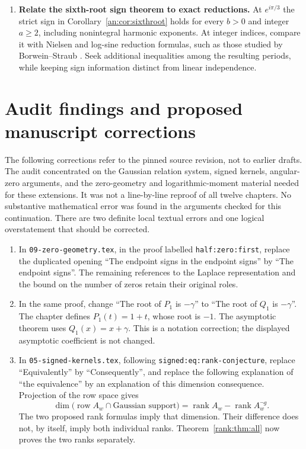 \documentclass[11pt]{article}
\numberwithin{equation}{section}
\theoremstyle{plain}
\theoremstyle{definition}
\theoremstyle{remark}
\DeclareMathOperator{\rank}{rank}
\begin{document}
\begin{enumerate}[leftmargin=*,itemsep=5pt,start=7]
\item \textbf{Relate the sixth-root sign theorem to exact reductions.}
At $e^{i\pi/3}$ the strict sign in Corollary~\ref{an:cor:sixthroot}
holds for every $b>0$ and integer $a\ge2$, including nonintegral
harmonic exponents. At integer indices, compare it with Nielsen and
log-sine reduction formulas, such as those studied by Borwein--Straub
\cite{BorweinStraub}. Seek additional inequalities among the resulting
periods, while keeping sign information distinct from linear
independence.
\end{enumerate}

\section{Audit findings and proposed manuscript corrections}
\label{sec:corrections}

The following corrections refer to the pinned source revision, not
to earlier drafts. The audit concentrated on the Gaussian relation
system, signed kernels, angular-zero arguments, and the zero-geometry
and logarithmic-moment material needed for these extensions. It was
not a line-by-line reproof of all twelve chapters. No substantive
mathematical error was found in the arguments checked for this
continuation. There are two definite local textual errors and one
logical overstatement that should be corrected.

\begin{enumerate}[leftmargin=*,itemsep=6pt]
\item In \texttt{09-zero-geometry.tex}, in the proof labelled
\texttt{half:zero:first}, replace the duplicated opening
``The endpoint signs in the endpoint signs'' by ``The endpoint signs''.
The remaining references to the Laplace representation and the bound
on the number of zeros retain their original roles.

\item In the same proof, change ``The root of $P_1$ is $-\gamma$''
to ``The root of $Q_1$ is $-\gamma$''. The chapter defines
$P_1(t)=1+t$, whose root is $-1$. The asymptotic theorem uses
$Q_1(x)=x+\gamma$. This is a notation correction; the displayed
asymptotic coefficient is not changed.

\item In \texttt{05-signed-kernels.tex}, following
\texttt{signed:eq:rank-conjecture}, replace ``Equivalently'' by
``Consequently'', and replace the following explanation of
``the equivalence'' by an explanation of this dimension consequence.
Projection of the row space gives
\[
 \dim\bigl(\operatorname{row}A_w\cap\text{Gaussian support}\bigr)
 =\rank A_w-\rank A_w^{\neg g}.
\]
The two proposed rank formulas imply that dimension. Their difference
does not, by itself, imply both individual ranks. Theorem~\ref{rank:thm:all}
now proves the two ranks separately.
\end{enumerate}
\end{document}
